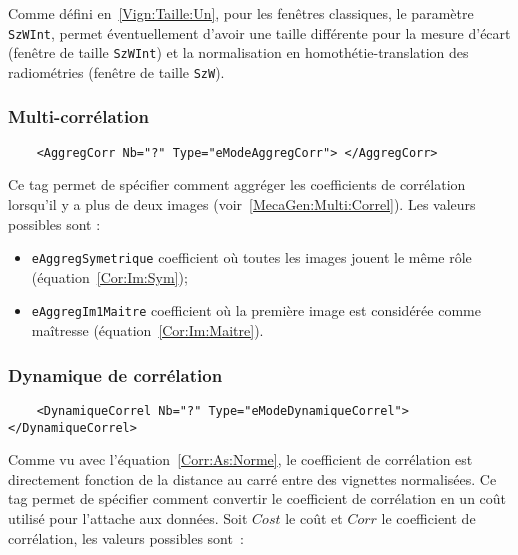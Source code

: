 Comme d\'efini en~\ref{Vign:Taille:Un}, pour les fen\^etres classiques,
le param\`etre {\tt SzWInt}, permet \'eventuellement d'avoir une taille
diff\'erente pour la  mesure d'\'ecart (fen\^etre de taille
{\tt SzWInt}) et la normalisation en homoth\'etie-translation
des radiom\'etries (fen\^etre de taille {\tt SzW}). 

\subsubsection{Multi-corr\'elation}

\label{Multi:Correl:Coef}

\begin{verbatim}
    <AggregCorr Nb="?" Type="eModeAggregCorr"> </AggregCorr>
\end{verbatim}

Ce tag permet de sp\'ecifier comment aggr\'eger les coefficients
de corr\'elation lorsqu'il y a plus de deux images 
(voir~\ref{MecaGen:Multi:Correl}). Les valeurs possibles sont :

\begin{itemize}
   \item {\tt eAggregSymetrique} coefficient o\`u toutes les images
         jouent le m\^eme r\^ole (\'equation~\ref{Cor:Im:Sym});

   \item {\tt eAggregIm1Maitre}  coefficient o\`u  la premi\`ere
         image est consid\'er\'ee comme ma\^itresse
         (\'equation~\ref{Cor:Im:Maitre}).
\end{itemize}



\subsubsection{Dynamique de corr\'elation}

\begin{verbatim}
    <DynamiqueCorrel Nb="?" Type="eModeDynamiqueCorrel"> </DynamiqueCorrel>
\end{verbatim}

Comme vu avec l'\'equation~\ref{Corr:As:Norme}, le coefficient 
de corr\'elation est directement fonction de la distance au carr\'e
entre des vignettes normalis\'ees. Ce tag permet de sp\'ecifier
comment convertir le coefficient de corr\'elation en un co\^ut
utilis\'e pour l'attache aux donn\'ees. Soit $Cost$ le co\^ut
et $Corr$ le coefficient de corr\'elation, les valeurs possibles
sont~:


